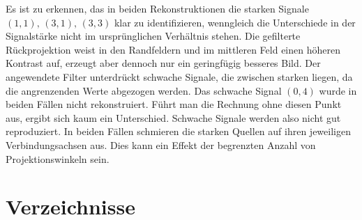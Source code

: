 \documentclass[slug=PET, room=Andreas-Schubert-Bau\,\ 424A,
supervisor=Carsten\ Bittrich, coursedate=10.\ 01.\ 2020, ngerman]{../../Lab_Report_LaTeX/lab_report}
\begin{document}
Es ist zu erkennen, das in beiden Rekonstruktionen die starken Signale
\((1,1),\,(3,1),\,(3,3)\) klar zu identifizieren, wenngleich die
Unterschiede in der Signalst\"arke nicht im urspr\"unglichen
Verh\"altnis stehen. Die gefilterte R\"uckprojektion weist in den
Randfeldern und im mittleren Feld einen h\"oheren Kontrast auf,
erzeugt aber dennoch nur ein geringf\"ugig besseres Bild.  Der
angewendete Filter unterdr\"uckt schwache Signale, die zwischen
starken liegen, da die angrenzenden Werte abgezogen werden.  Das
schwache Signal \((0,4)\) wurde in beiden F\"allen nicht
rekonstruiert. F\"uhrt man die Rechnung ohne diesen Punkt aus, ergibt
sich kaum ein Unterschied. Schwache Signale werden also nicht gut
reproduziert. In beiden F\"allen schmieren die starken Quellen auf
ihren jeweiligen Verbindungsachsen aus. Dies kann ein Effekt der
begrenzten Anzahl von Projektionswinkeln sein.

\newpage
\section{Verzeichnisse}
\label{sec:literatur}

\listoffigures

\listoftables

\printbibliography
\end{document}

